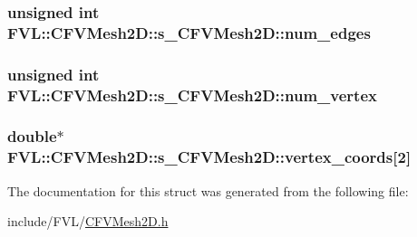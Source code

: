 \label{da/d6f/structFVL_1_1CFVMesh2D_1_1s__CFVMesh2D_a1c6b6a7f5071a2bfe7bd5a23061a3db6}
\hypertarget{structFVL_1_1CFVMesh2D_1_1s__CFVMesh2D_a2d742f260aeff149f645c125ef17c97b}{
\subsubsection[{num\_\-edges}]{\setlength{\rightskip}{0pt plus 5cm}unsigned int {\bf FVL::CFVMesh2D::s\_\-CFVMesh2D::num\_\-edges}}}
\label{da/d6f/structFVL_1_1CFVMesh2D_1_1s__CFVMesh2D_a2d742f260aeff149f645c125ef17c97b}
\hypertarget{structFVL_1_1CFVMesh2D_1_1s__CFVMesh2D_a338044b4e98884f1c4405352536a83c4}{
\subsubsection[{num\_\-vertex}]{\setlength{\rightskip}{0pt plus 5cm}unsigned int {\bf FVL::CFVMesh2D::s\_\-CFVMesh2D::num\_\-vertex}}}
\label{da/d6f/structFVL_1_1CFVMesh2D_1_1s__CFVMesh2D_a338044b4e98884f1c4405352536a83c4}
\hypertarget{structFVL_1_1CFVMesh2D_1_1s__CFVMesh2D_a9a22e241caf438470a98dfdef6b43797}{
\subsubsection[{vertex\_\-coords}]{\setlength{\rightskip}{0pt plus 5cm}double$\ast$ {\bf FVL::CFVMesh2D::s\_\-CFVMesh2D::vertex\_\-coords}\mbox{[}2\mbox{]}}}
\label{da/d6f/structFVL_1_1CFVMesh2D_1_1s__CFVMesh2D_a9a22e241caf438470a98dfdef6b43797}


The documentation for this struct was generated from the following file:\begin{DoxyCompactItemize}
\item 
include/FVL/\hyperlink{CFVMesh2D_8h}{CFVMesh2D.h}\end{DoxyCompactItemize}

